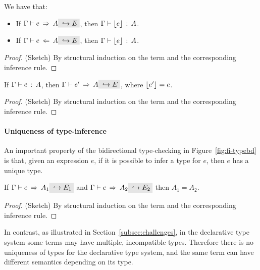 \begin{theorem}
  We have that:
  \begin{itemize}
    \item If $ \jinfer \Gamma e A \yields E$, then $ \Gamma \vdash \lfloor e \rfloor \ \!:\! \ A$.
    \item If $ \jcheck \Gamma e A \yields E$, then $ \Gamma \vdash \lfloor e \rfloor \ \!:\! \ A$.
  \end{itemize}
\end{theorem}

\begin{proof}
  (Sketch) By structural induction on the term and the corresponding
  inference rule.
\end{proof}

\begin{theorem}
If $ \Gamma \vdash e \ \!:\! \ A$, then $ \jinfer \Gamma {e'} A \yields E$, where $\lfloor e' \rfloor = e$.
\end{theorem}

\begin{proof}
  (Sketch) By structural induction on the term and the corresponding
  inference rule.
\end{proof}

\paragraph{Uniqueness of type-inference} An important property of the
bidirectional type-checking in Figure~\ref{fig:fi-typebd} is that, given an expression $e$, if it is
possible to infer a type for $e$, then $e$ has a unique type.

\begin{theorem}
\label{theorem:uniqueness-type-inference}
If $\jinfer \Gamma e {A_1} \yields {E_1}$ and $\jinfer \Gamma e {A_2} \yields {E_2}$ then 
${A_1} = {A_2}$.
\end{theorem}

\begin{proof}
  (Sketch) By structural induction on the term and the corresponding
  inference rule.
\end{proof}

In contrast, as illustrated in Section~\ref{subsec:challenges}, in the declarative type
system some terms may have multiple, incompatible types. Therefore
there is no uniqueness of types for the declarative type system, and
the same term can have different semantics depending on its type.


